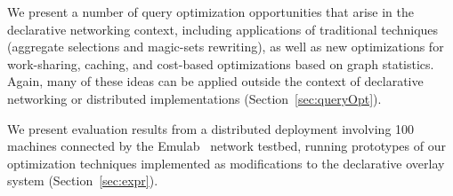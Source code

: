 \begin{mylist}
\item We present a number of query optimization opportunities that
  arise in the declarative networking context, including applications
  of traditional techniques (\eg aggregate selections and magic-sets
  rewriting), as well as new optimizations for work-sharing, caching, and cost-based optimizations based on graph
  statistics.  Again, many of these ideas can be applied
  outside the context of declarative networking or
  distributed implementations (Section~\ref{sec:queryOpt}).


\item We present evaluation results from a distributed deployment
  involving 100 machines connected by the Emulab~\cite{emulab} network testbed,
  running prototypes of our optimization techniques implemented as
  modifications to the \Pitu declarative overlay system (Section~\ref{sec:expr}).
\end{mylist}


